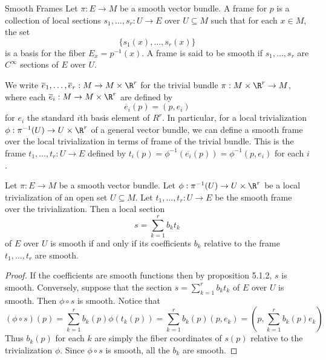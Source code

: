\documentclass[a4paper]{article}
\begin{document}
\begin{defn}{Smooth Frames}{} Let $\pi:E\to M$ be a smooth vector bundle. A frame for $p$ is a collection of local sections $s_1,\dots,s_r:U\to E$ over $U\subseteq M$ such that for each $x\in M$, the set $$\{s_1(x),\dots,s_r(x)\}$$ is a basis for the fiber $E_x=p^{-1}(x)$. A frame is said to be smooth if $s_1,\dots,s_r$ are $C^\infty$ sections of $E$ over $U$. 
\end{defn}

We write $\overline{e}_1,\dots,\overline{e}_r:M\to M\times\R^r$ for the trivial bundle $\pi:M\times\R^r\to M$, where each $\overline{e}_i:M\to M\times\R^r$ are defined by $$\overline{e}_i(p)=(p,e_i)$$ for $e_i$ the standard $i$th basis element of $R^r$. In particular, for a local trivialization $\phi:\pi^{-1}(U)\to U\times\R^r$ of a general vector bundle, we can define a smooth frame over the local trivialization in terms of frame of the trivial bundle. This is the frame $t_1,\dots,t_r:U\to E$ defined by $t_i(p)=\phi^{-1}(\overline{e_i}(p))=\phi^{-1}(p,e_i)$ for each $i$. 

\begin{lmm}{}{} Let $\pi:E\to M$ be a smooth vector bundle. Let $\phi:\pi^{-1}(U)\to U\times\R^r$ be a local trivialization of an open set $U\subseteq M$. Let $t_1,\dots,t_r:U\to E$ be the smooth frame over the trivialization. Then a local section $$s=\sum_{k=1}^rb_kt_k$$ of $E$ over $U$ is smooth if and only if its coefficients $b_k$ relative to the frame $t_1,\dots,t_r$ are smooth. \tcbline
\begin{proof}
If the coefficients are smooth functions then by proposition 5.1.2, $s$ is smooth. Conversely, suppose that the section $s=\sum_{k=1}^rb_kt_k$ of $E$ over $U$ is smooth. Then $\phi\circ s$ is smooth. Notice that $$(\phi\circ s)(p)=\sum_{k=1}^rb_k(p)\phi(t_k(p))=\sum_{k=1}^rb_k(p)(p,e_k)=\left(p,\sum_{k=1}^rb_k(p)e_k\right)$$ Thus $b_k(p)$ for each $k$ are simply the fiber coordinates of $s(p)$ relative to the trivialization $\phi$. Since $\phi\circ s$ is smooth, all the $b_k$ are smooth. 
\end{proof}
\end{lmm}
\end{document}
